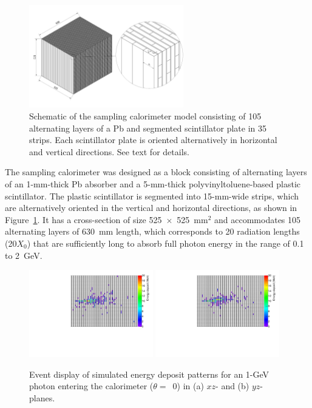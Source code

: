 \documentclass[preprint,12pt,times,a4paper]{elsarticle}
\begin{document}
\begin{figure}[!hbt]
\centering
\includegraphics[width=0.6\textwidth]{Fig1_detector_schematic.jpeg}
\caption{ Schematic of the sampling calorimeter model consisting of 105 alternating layers of a Pb and segmented scintillator plate in 35 strips. Each scintillator plate is oriented alternatively in horizontal and vertical directions. See text for details. }
\label{fig:det_conf}
\end{figure}


The sampling calorimeter was designed as a block consisting of alternating layers of an 1-mm-thick Pb absorber and a 5-mm-thick polyvinyltoluene-based plastic scintillator. The plastic scintillator is segmented into 15-mm-wide strips, which are alternatively oriented in the vertical and horizontal directions, as shown in Figure~\ref{fig:det_conf}. It has a cross-section of size 525~$\times$~525~mm$^{2}$ and accommodates 105 alternating layers of 630~mm length, which corresponds to 20 radiation lengths (20$X_{0}$) that are sufficiently long to absorb full photon energy in the range of 0.1 to 2~GeV.

\begin{figure}[!hbt]
\centering
\includegraphics[width=0.48\textwidth]{Fig2_EMShower_XZ.pdf}
\includegraphics[width=0.48\textwidth]{Fig2_EMShower_YZ.pdf}
\caption{ Event display of simulated energy deposit patterns for an 1-GeV photon entering the calorimeter ($\theta=$~0) in (a) $xz$- and (b) $yz$-planes.}
\label{fig:Evt_Dis}
\end{figure}
\end{document}
